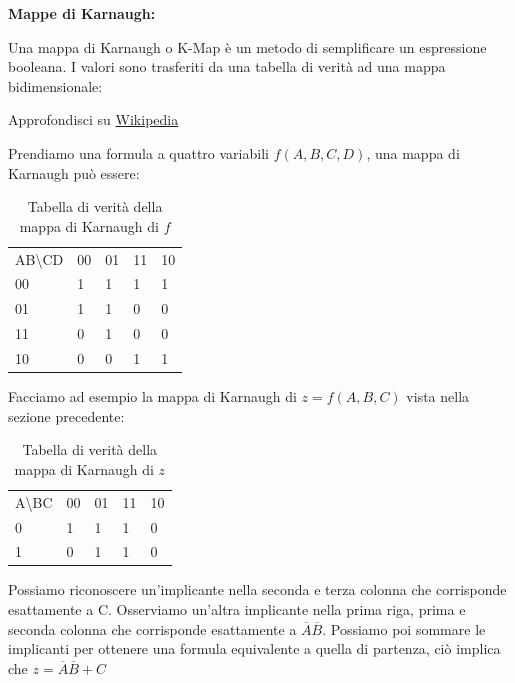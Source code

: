 \begin{defn}
	\textbf{Mappe di Karnaugh:}
	
	Una mappa di Karnaugh o K-Map è un metodo di semplificare un espressione booleana. I valori sono trasferiti da una tabella di verità ad una mappa bidimensionale:
	
	Approfondisci su \href{https://en.wikipedia.org/wiki/Karnaugh_map}{Wikipedia}
	
	Prendiamo una formula a quattro variabili $ f(A,B,C,D) $, una mappa di Karnaugh può essere:
	\begin{table}[H]
		\centering
		\caption{Tabella di verità della mappa di Karnaugh di $f$}
		\label{tab:karnaugh}
		\begin{tabular}{lllll}
			AB\textbackslash{}CD    & 00                     & 01                     & 11                     & 10                     \\ \cline{2-5} 
			\multicolumn{1}{l|}{00} & \multicolumn{1}{l|}{1} & \multicolumn{1}{l|}{1} & \multicolumn{1}{l|}{1} & \multicolumn{1}{l|}{1} \\ \cline{2-5} 
			\multicolumn{1}{l|}{01} & \multicolumn{1}{l|}{1} & \multicolumn{1}{l|}{1} & \multicolumn{1}{l|}{0} & \multicolumn{1}{l|}{0} \\ \cline{2-5} 
			\multicolumn{1}{l|}{11} & \multicolumn{1}{l|}{0} & \multicolumn{1}{l|}{1} & \multicolumn{1}{l|}{0} & \multicolumn{1}{l|}{0} \\ \cline{2-5} 
			\multicolumn{1}{l|}{10} & \multicolumn{1}{l|}{0} & \multicolumn{1}{l|}{0} & \multicolumn{1}{l|}{1} & \multicolumn{1}{l|}{1} \\ \cline{2-5} 
		\end{tabular}
	\end{table}
	
	Facciamo ad esempio la mappa di Karnaugh di $ z = f(A,B,C) $ vista nella sezione precedente:
	
	\begin{table}[H]
		\centering
		\caption{Tabella di verità della mappa di Karnaugh di $z$}
		\label{tab:karnaugh}
		\begin{tabular}{lllll}
			A\textbackslash{}BC    & 00                     & 01                     & 11                     & 10                     \\ \cline{2-5} 
			\multicolumn{1}{l|}{0} & \multicolumn{1}{l|}{1} & \multicolumn{1}{l|}{1} & \multicolumn{1}{l|}{1} & \multicolumn{1}{l|}{0} \\ \cline{2-5} 
			\multicolumn{1}{l|}{1} & \multicolumn{1}{l|}{0} & \multicolumn{1}{l|}{1} & \multicolumn{1}{l|}{1} & \multicolumn{1}{l|}{0} \\ \cline{2-5} 
		\end{tabular}
	\end{table}
	
	Possiamo riconoscere un'implicante nella seconda e terza colonna che corrisponde esattamente a C. Osserviamo un'altra implicante nella prima riga, prima e seconda colonna che corrisponde esattamente a $ \overbar{A}\overbar{B} $. Possiamo poi sommare le implicanti per ottenere una formula equivalente a quella di partenza, ciò implica che $ z =  \overbar{A}\overbar{B} + C $
\end{defn}

